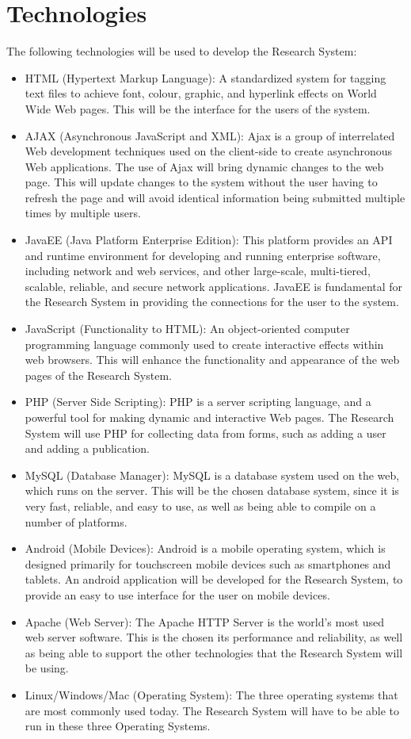 \documentclass[a4paper]{article}
\begin{document}
\section{Technologies}
    The following technologies will be used to develop the Research System:
    \begin{itemize}
        \item HTML (Hypertext Markup Language): A standardized system for tagging text files to achieve font, colour, graphic, and hyperlink effects on World Wide Web pages. This will be the interface for the users of the system. 
        \item AJAX (Asynchronous JavaScript and XML): Ajax is a group of interrelated Web development techniques used on the client-side to create asynchronous Web applications. The use of Ajax will bring dynamic changes to the web page. This will update changes to the system without the user having to refresh the page and will avoid identical information being submitted multiple times by multiple users. 
        \item JavaEE (Java Platform Enterprise Edition): This platform provides an API and runtime environment for developing and running enterprise software, including network and web services, and other large-scale, multi-tiered, scalable, reliable, and secure network applications. JavaEE is fundamental for the Research System in providing the connections for the user to the system.
        \item JavaScript (Functionality to HTML): An object-oriented computer programming language commonly used to create interactive effects within web browsers. This will enhance the functionality and appearance of the web pages of the Research System.
        \item PHP (Server Side Scripting): PHP is a server scripting language, and a powerful tool for making dynamic and interactive Web pages. The Research System will use PHP for collecting data from forms, such as adding a user and adding a publication. 
        \item MySQL (Database Manager): MySQL is a database system used on the web, which runs on the server. This will be the chosen database system, since it is very fast, reliable, and easy to use, as well as being able to compile on a number of platforms.
        \item Android (Mobile Devices): Android is a mobile operating system, which is designed primarily for touchscreen mobile devices such as smartphones and tablets. An android application will be developed for the Research System, to provide an easy to use interface for the user on mobile devices.
        \item Apache (Web Server): The Apache HTTP Server is the world's most used web server software. This is the chosen its performance and reliability, as well as being able to support the other technologies that the Research System will be using. 
        \item Linux/Windows/Mac (Operating System): The three operating systems that are most commonly used today. The Research System will have to be able to run in these three Operating Systems.
        \\
        \\
    \end{itemize}
\end{document}
